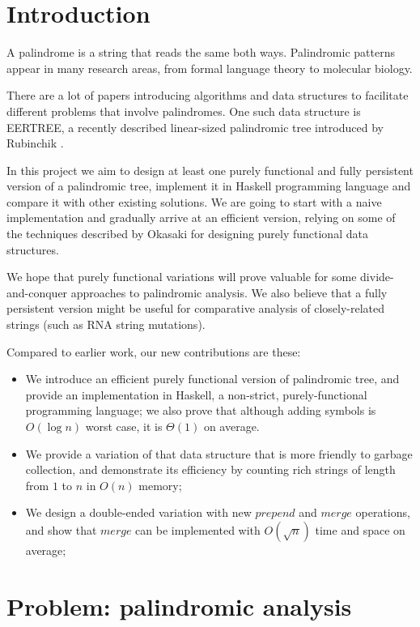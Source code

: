 \section{Introduction}

A palindrome is a string that reads the same both ways.
Palindromic patterns appear in many research areas, from
formal language theory to molecular biology.

There are a lot of papers introducing algorithms and data structures
to facilitate different problems that involve palindromes.
One such data structure is EERTREE, a recently described
linear-sized palindromic tree introduced by Rubinchik \cite{RUBINCHIK2018249}.

In this project we aim to design at least one purely functional and
fully persistent version of a palindromic tree, implement it
in Haskell programming language and compare it
with other existing solutions. We are going to start with
a naive implementation and gradually arrive at an efficient
version, relying on some of the techniques described by
Okasaki \cite{Okasaki1998} for designing purely functional data structures.

We hope that purely functional variations will prove valuable
for some divide-and-conquer approaches to palindromic analysis.
We also believe that a fully persistent version might be useful
for comparative analysis of closely-related strings
(such as RNA string mutations).

Compared to earlier work, our new contributions are these:

\begin{itemize}
\item We introduce an efficient purely functional version of palindromic tree,
  and provide an implementation in Haskell, a non-strict, purely-functional
  programming language; we also prove that although adding symbols is $O(\log{}n)$ worst case, it is $\Theta(1)$ on average.
\item We provide a variation of that data structure that is more
  friendly to garbage collection, and demonstrate its efficiency
  by counting rich strings of length from $1$ to $n$ in $O(n)$ memory;
\item We design a double-ended variation with new $prepend$
  and $merge$ operations, and show that $merge$ can be implemented
  with $O(\sqrt{n})$ time and space on average;
\end{itemize}

\section{Problem: palindromic analysis}

